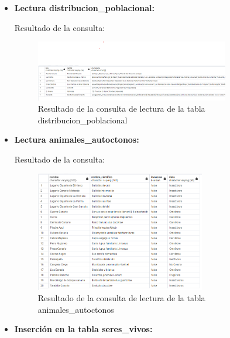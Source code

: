 \documentclass[11pt]{report}
\begin{document}
\begin{itemize}
      
\item \textbf{Lectura distribucion\_poblacional:} 
\lstset{style=mystyle}


Resultado de la consulta:

\begin{figure}[H]
      \centering
      \includegraphics[width=0.8\textwidth]{src/img/read_distribucion_poblacional.png}
      \caption{Resultado de la consulta de lectura de la tabla distribucion\_poblacional}
      \label{fig:read_distribucion}
\end{figure}

\item \textbf{Lectura animales\_autoctonos:} 
\lstset{style=mystyle}


Resultado de la consulta:

\begin{figure}[H]
      \centering
      \includegraphics[width=0.7\textwidth]{src/img/read_animales_autoctonos.png}
      \caption{Resultado de la consulta de lectura de la tabla animales\_autoctonos}
      \label{fig:read_animals}
\end{figure}

\item \textbf{Inserción en la tabla seres\_vivos:} 
\lstset{style=mystyle}



\end{itemize}
\end{document}
